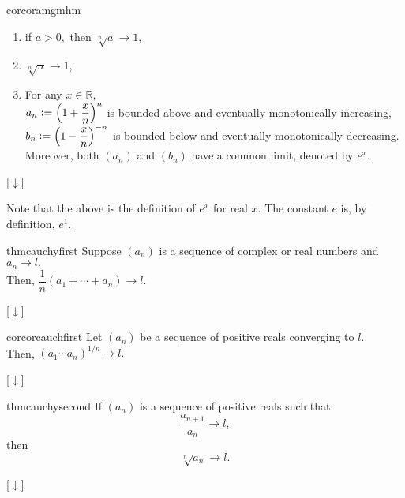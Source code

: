 \documentclass[12pt,oneside]{book}
\theoremstyle{definition}
\numberwithin{thm}{chapter}
\newcommand{\downsym}{[$\downarrow$]}
\begin{document}
\begin{restatable}[]{cor}{coramgmhm}
\label{cor:coramgmhm}
	\begin{enumerate}[label = (\roman*)]
		\item if $a > 0,$ then $\sqrt[n]{a} \to 1,$
		\item $\sqrt[n]{n} \to 1$,
		\item For any $x \in \mathbb{R},$ \\
		$a_n \vcentcolon= \left(1 + \dfrac{x}{n}\right)^n$ is bounded above and eventually monotonically increasing,\\
		$b_n \vcentcolon= \left(1 - \dfrac{x}{n}\right)^{-n}$ is bounded below and eventually monotonically decreasing.\\
		Moreover, both $(a_n)$ and $(b_n)$ have a common limit, denoted by $e^x.$
	\end{enumerate}
\end{restatable}
\begin{flushright}\hyperref[cor:coramgmhm2]{\downsym}\end{flushright}
Note that the above is the definition of $e^x$ for real $x.$ The constant $e$ is, by definition, $e^1.$

\begin{restatable}{thm}{cauchyfirst}
\label{thm:cauchyfirst}
	Suppose $(a_n)$ is a sequence of complex or real numbers and $a_n \to l.$\\
	Then, $\dfrac{1}{n}(a_1 + \cdots + a_n) \to l.$
\end{restatable}
\begin{flushright}\hyperref[thm:cauchyfirst2]{\downsym}\end{flushright}

\begin{restatable}[]{cor}{corcauchfirst}
\label{cor:corcauchfirst}
	Let $(a_n)$ be a sequence of positive reals converging to $l.$\\
	Then, $(a_1\cdots a_n)^{1/n} \to l.$
\end{restatable}
\begin{flushright}\hyperref[cor:corcauchfirst2]{\downsym}\end{flushright}

\begin{restatable}{thm}{cauchysecond}
\label{thm:cauchysecond}
	If $(a_n)$ is a sequence of positive reals such that
	\begin{equation*} 
		\dfrac{a_{n+1}}{a_n} \to l,
	\end{equation*}
	then
	\begin{equation*} 
		\sqrt[n]{a_n} \to l.
	\end{equation*}
\end{restatable}
\begin{flushright}\hyperref[thm:cauchysecond2]{\downsym}\end{flushright}
\end{document}
